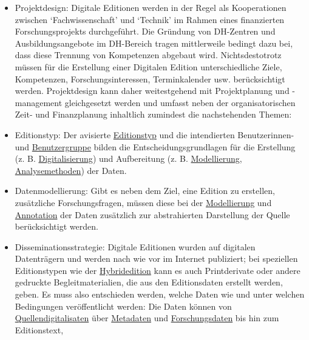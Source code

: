 \documentclass{article}
\begin{document}
        \begin{itemize}\item {Projektdesign: Digitale Editionen werden in der Regel als Kooperationen
                     zwischen ‘Fachwissenschaft’ und ‘Technik’ im Rahmen eines finanzierten
                     Forschungsprojekts durchgeführt. Die Gründung von DH-Zentren und
                     Ausbildungsangebote im DH-Bereich tragen mittlerweile bedingt dazu bei, dass
                     diese Trennung von Kompetenzen abgebaut wird. Nichtsdestotrotz müssen für die
                     Erstellung einer Digitalen Edition unterschiedliche Ziele, Kompetenzen,
                     Forschungsinteressen, Terminkalender usw. berücksichtigt werden. Projektdesign
                     kann daher weitestgehend mit Projektplanung und -management gleichgesetzt
                     werden und umfasst neben der organisatorischen Zeit- und Finanzplanung
                     inhaltlich zumindest die nachstehenden Themen:}\item { Editionstyp: Der avisierte \href{http://gams.uni-graz.at/o:konde.76}{Editionstyp} und die intendierten Benutzerinnen- und \href{http://gams.uni-graz.at/o:konde.148}{Benutzergruppe} bilden die
                     Entscheidungsgrundlagen für die Erstellung (z. B. \href{http://gams.uni-graz.at/o:konde.60}{Digitalisierung}) und Aufbereitung (z. B. \href{http://gams.uni-graz.at/o:konde.137}{Modellierung}, \href{http://gams.uni-graz.at/o:konde.16}{Analysemethoden}) der
                     Daten.}\item { Datenmodellierung: Gibt es neben dem Ziel, eine Edition zu erstellen,
                     zusätzliche Forschungsfragen, müssen diese bei der \href{http://gams.uni-graz.at/o:konde.137}{Modellierung} und \href{http://gams.uni-graz.at/o:konde.17}{Annotation} der Daten zusätzlich zur abstrahierten
                     Darstellung der Quelle berücksichtigt werden.}\item { Disseminationsstrategie: Digitale Editionen wurden auf digitalen
                     Datenträgern und werden nach wie vor im Internet publiziert; bei speziellen
                     Editionstypen wie der \href{http://gams.uni-graz.at/o:konde.96}{Hybridedition} kann es auch Printderivate oder andere gedruckte
                     Begleitmaterialien, die aus den Editionsdaten erstellt werden, geben. Es muss
                     also entschieden werden, welche Daten wie und unter welchen Bedingungen
                     veröffentlicht werden: Die Daten können von \href{http://gams.uni-graz.at/o:konde.36}{Quellendigitalisaten} über \href{http://gams.uni-graz.at/o:konde.25}{Metadaten} und \href{http://gams.uni-graz.at/o:konde.87}{Forschungsdaten} bis hin zum Editionstext,
}
\end{itemize}
\end{document}
